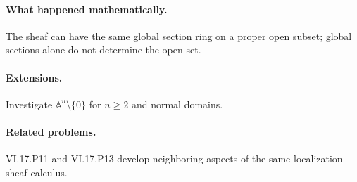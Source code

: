 \paragraph{What happened mathematically.}
The sheaf can have the same global section ring on a proper open subset; global sections alone do not determine the open set.

\paragraph{Extensions.}
Investigate $\mathbb A^n\setminus\{0\}$ for $n\ge2$ and normal domains.

\paragraph{Related problems.}
VI.17.P11 and VI.17.P13 develop neighboring aspects of the same localization-sheaf calculus.
\fi
